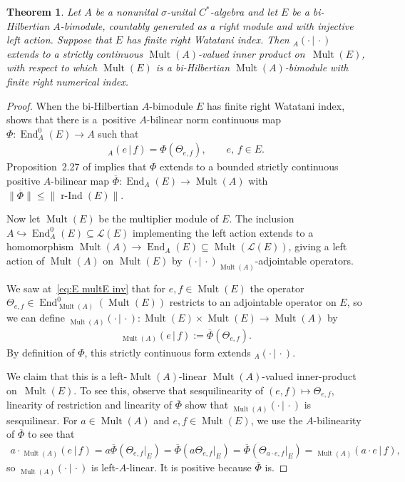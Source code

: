 \documentclass[pdftex]{sigma}
\numberwithin{equation}{section}
\newtheorem{thm}{Theorem}[section]
\DeclareMathOperator{\End}{End} %
\DeclareMathOperator{\Mult}{Mult} %
\newcommand{\rInd}{\operatorname{\mbox{$r$-$\operatorname{Ind}$}}}
\renewcommand{\L}{\mathcal{L}}
\newcommand{\ol}[1]{\overline{#1}} %
\begin{document}
\begin{thm}\label{thm:main} Let $A$ be a nonunital $\sigma$-unital $C^*$-algebra and let $E$ be a bi-Hilbertian $A$-bimodule, countably generated as a right module and with injective left action. Suppose that $E$ has finite right Watatani index. Then ${_A(\cdot \,|\, \cdot)}$ extends to a strictly continuous $\Mult(A)$-valued inner product on~$\Mult(E)$, with respect to which $\Mult(E)$ is a bi-Hilbertian $\Mult(A)$-bimodule with finite right numerical index.
\end{thm}
\begin{proof}
When the bi-Hilbertian $A$-bimodule $E$ has f\/inite right Watatani index, \cite[Corollary~2.11]{KajPinWat} shows that there is a~positive $A$-bilinear norm continuous map $\Phi\colon \End_A^0(E)\to A$ such that
\begin{gather*}
{}_A(e\,|\, f)=\Phi(\Theta_{e,f}),\qquad e,\,f\in E.
\end{gather*}
Proposition~2.27 of \cite{KajPinWat} implies that $\Phi$ extends to a bounded strictly continuous positive $A$-bilinear map $\overline{\Phi} \colon \End_{A}(E)\to \Mult(A)$ with $\|\ol{\Phi}\| \le \|\rInd(E)\|$.

Now let $\Mult(E)$ be the multiplier module of $E$. The inclusion $A \hookrightarrow \End^0_A(E) \subseteq \L(E)$ implementing the left action extends to a homomorphism $\Mult(A) \to \End_A(E) \subseteq \Mult(\L(E))$, giving a left action of $\Mult(A)$ on $\Mult(E)$ by $(\cdot \,|\, \cdot)_{\Mult(A)}$-adjointable operators.

We saw at~\eqref{eq:E multE inv} that for $e,f \in \Mult(E)$ the operator $\Theta_{e,f} \in \End^0_{\Mult(A)}(\Mult(E))$ restricts to an adjointable operator on $E$, so we can def\/ine ${_{\Mult(A)}(\cdot \,|\, \cdot)} \colon \Mult(E) \times \Mult(E) \to \Mult(A)$ by
\begin{gather*}
{}_{\Mult(A)}(e\,|\, f):=\ol{\Phi}(\Theta_{e,f}).
\end{gather*}
By def\/inition of $\Phi$, this strictly continuous form extends ${_A(\cdot \,|\, \cdot)}$.

We claim that this is a left-$\Mult(A)$-linear $\Mult(A)$-valued inner-product on~$\Mult(E)$. To see this, observe that sesquilinearity of $(e,f) \mapsto \Theta_{e,f}$, linearity of restriction and linearity of $\overline{\Phi}$ show that ${_{\Mult(A)}(\cdot \,|\, \cdot)}$ is sesquilinear. For $a \in \Mult(A)$ and $e,f \in \Mult(E)$, we use the $A$-bilinearity of $\overline{\Phi}$ to see that
\begin{gather*}
a \cdot {_{\Mult(A)}(e \,|\, f)} = a \overline{\Phi}(\Theta_{e,f}|_E) = \overline{\Phi}(a \Theta_{e,f}|_E) = \overline{\Phi}(\Theta_{a \cdot e, f}|_E) = {_{\Mult(A)}(a \cdot e \,|\, f)},
\end{gather*}
so ${_{\Mult(A)}(\cdot \,|\, \cdot)}$ is left-$A$-linear. It is positive because
$\overline{\Phi}$ is.


\end{proof}
\end{document}
